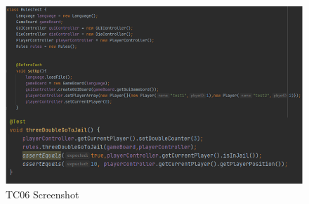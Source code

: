 \begin{flushleft}
\begin{figure}[H]
    \centering
    \includegraphics[width=16cm]{Report/figures/Unittests/BilagTC06.png}
    \caption{TC06 Screenshot}
    \label{TC06Bilag}
\end{figure}

\end{flushleft}
